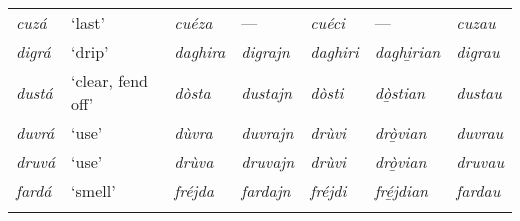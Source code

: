 \begin{sidewaystable}
\begin{tabularx}{\textwidth}{lllllll}
		\textit{cuzá} & ‘last’ & \textit{cuéza} & --- & \textit{cuéci} & --- & \textit{cuzau}\\ 
		\textit{digrá} & ‘drip’ & \textit{daghira} & \textit{digrajn} & \textit{daghiri} & \textit{daghi̱rian} & \textit{digrau}\\
		\textit{dustá} & `clear, fend off' & \textit{dòsta} & \textit{dustajn} & \textit{dòsti} & \textit{dò̱stian} & \textit{dustau}\\
		\textit{duvrá} & ‘use’ & \textit{dùvra} & \textit{duvrajn} & \textit{drùvi} & \textit{drò̱vian} & \textit{duvrau}\\
		\textit{druvá} & `use' & \textit{drùva} & \textit{druvajn} & \textit{drùvi} & \textit{drò̱vian} & \textit{druvau}\\
		\textit{fardá} & `smell' & \textit{fréjda} & \textit{fardajn} & \textit{fréjdi} & \textit{fré̱jdian} & \textit{fardau}\\
		\lspbottomrule& 
	\end{tabularx} 
\end{sidewaystable}



